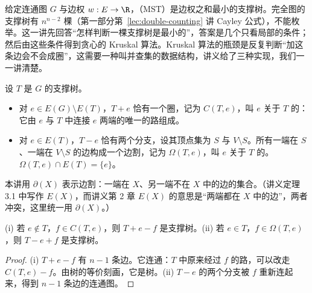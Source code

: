 \label{lec:mst-kruskal}

给定连通图 $G$ 与边权 $w:E\to\R$，（MST）是边权之和最小的支撑树。完全图的支撑树有 $n^{n-2}$ 棵（第一部分第~\ref{lec:double-counting} 讲 Cayley 公式），不能枚举。这一讲先回答“怎样判断一棵支撑树是最小的”，答案是几个只看局部的条件；然后由这些条件得到贪心的 Kruskal 算法。Kruskal 算法的瓶颈是反复判断“加这条边会不会成圈”，这需要一种叫并查集的数据结构，讲义给了三种实现，我们一一讲清楚。


设 $T$ 是 $G$ 的支撑树。
\begin{itemize}
\item 对 $e\in E(G)\setminus E(T)$，$T+e$ 恰有一个圈，记为 $C(T,e)$，叫 $e$ 关于 $T$ 的：它由 $e$ 与 $T$ 中连接 $e$ 两端的唯一的路组成。
\item 对 $e\in E(T)$，$T-e$ 恰有两个分支，设其顶点集为 $S$ 与 $V\setminus S$。所有一端在 $S$、一端在 $V\setminus S$ 的边构成一个边割，记为 $\Omega(T,e)$，叫 $e$ 关于 $T$ 的。$\Omega(T,e)\cap E(T)=\{e\}$。
\end{itemize}
本讲用 $\partial(X)$ 表示边割：一端在 $X$、另一端不在 $X$ 中的边的集合。（讲义定理 3.1 中写作 $E(X)$，而讲义第 2 章 $E(X)$ 的意思是“两端都在 $X$ 中的边”，两者冲突，这里统一用 $\partial(X)$。）

\begin{lemma}[交换引理]\label{lem:mst-kruskal:exchange}
(i) 若 $e\notin T$，$f\in C(T,e)$，则 $T+e-f$ 是支撑树。(ii) 若 $e\in T$，$f\in\Omega(T,e)$，则 $T-e+f$ 是支撑树。
\end{lemma}
\begin{proof}
(i) $T+e-f$ 有 $n-1$ 条边。它连通：$T$ 中原来经过 $f$ 的路，可以改走 $C(T,e)-f$。由树的等价刻画，它是树。(ii) $T-e$ 的两个分支被 $f$ 重新连起来，得到 $n-1$ 条边的连通图。
\end{proof}


